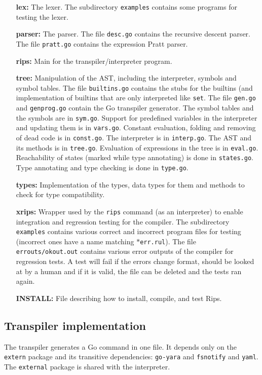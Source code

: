 \documentclass[a4paper]{article}
\begin{document}
\begin{itemize}
\item[\textbf{lex:}] The lexer. The subdirectory \texttt{examples} contains some
programs for testing the lexer.

\item[\textbf{parser:}] The parser. The file \texttt{desc.go} contains
the recursive descent parser.  The file \texttt{pratt.go} contains the
expression Pratt parser.

\item[\textbf{rips:}] Main for the transpiler/interpreter program.

\item[\textbf{tree:}] Manipulation of the AST, including the interpreter,
symbols and symbol tables.  The file \texttt{builtins.go} contains
the stubs for the builtins (and implementation of builtins that
are only interpreted like \texttt{set}. The file \texttt{gen.go} and
\texttt{genprog.go} contain the Go transpiler generator. The symbol tables and
the symbols are in \texttt{sym.go}. Support for predefined variables
in the interpreter and updating them is in \texttt{vars.go}. Constant
evaluation, folding and removing of dead code is in \texttt{const.go}. The
interpreter is in \texttt{interp.go}. The AST and its methods is
in \texttt{tree.go}. Evaluation of expressions in the tree is in
\texttt{eval.go}. Reachability of states (marked while type annotating)
is done in \texttt{states.go}. Type annotating and type checking is done
in \texttt{type.go}.

\item[\textbf{types:}] Implementation of the types, data types for them
and methods to check for type compatibility.

\item[\textbf{xrips:}] Wrapper used by the \texttt{rips} command (as an
interpreter) to enable integration and regression testing for the compiler.
The subdirectory \texttt{examples} contains various correct and
incorrect program files for testing (incorrect ones have a name matching
\texttt{$*$err.rul}). The file \texttt{errouts/okout.out} contains various
error outputs of the compiler for regression tests. A test will fail if
the errors change format, should be looked at by a human and if it is
valid, the file can be deleted and the tests ran again.

\item[\textbf{INSTALL:}] File describing how to install, compile, and test Rips.
\end{itemize}

\subsection{Transpiler implementation}
The transpiler generates a Go command in one file. It depends only on the
\texttt{extern} package and its transitive dependencies: \texttt{go-yara} and
\texttt{fsnotify} and \texttt{yaml}. The \texttt{external} package is shared with
the interpreter.
\end{document}
